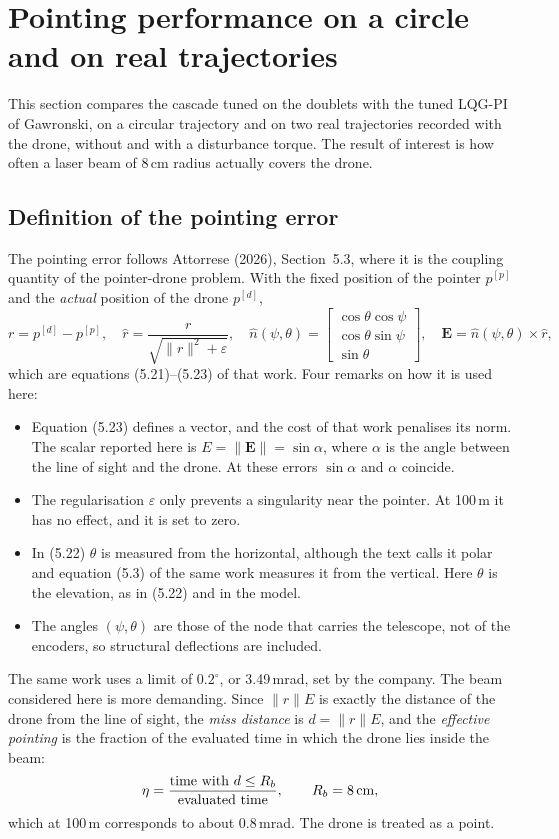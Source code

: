 \section{Pointing performance on a circle and on real trajectories}\label{sec:thesis}
This section compares the cascade tuned on the doublets with the tuned LQG-PI of Gawronski, on a circular trajectory and on two real trajectories recorded with the drone, without and with a disturbance torque. The result of interest is how often a laser beam of 8\,cm radius actually covers the drone.

\subsection{Definition of the pointing error}\label{sec:tp_def}
The pointing error follows Attorrese (2026), Section~5.3, where it is the coupling quantity of the pointer-drone problem. With the fixed position of the pointer $p^{[p]}$ and the \emph{actual} position of the drone $p^{[d]}$,
\begin{equation}
r=p^{[d]}-p^{[p]},\quad\hat r=\frac{r}{\sqrt{\lVert r\rVert^2+\varepsilon}},\quad
\hat n(\psi,\theta)=\begin{bmatrix}\cos\theta\cos\psi\\\cos\theta\sin\psi\\\sin\theta\end{bmatrix},\quad
\bm E=\hat n(\psi,\theta)\times\hat r,
\end{equation}
which are equations (5.21)--(5.23) of that work. Four remarks on how it is used here:
\begin{itemize}
\item Equation (5.23) defines a vector, and the cost of that work penalises its norm. The scalar reported here is $E=\lVert\bm E\rVert=\sin\alpha$, where $\alpha$ is the angle between the line of sight and the drone. At these errors $\sin\alpha$ and $\alpha$ coincide.
\item The regularisation $\varepsilon$ only prevents a singularity near the pointer. At 100\,m it has no effect, and it is set to zero.
\item In (5.22) $\theta$ is measured from the horizontal, although the text calls it polar and equation (5.3) of the same work measures it from the vertical. Here $\theta$ is the elevation, as in (5.22) and in the model.
\item The angles $(\psi,\theta)$ are those of the node that carries the telescope, not of the encoders, so structural deflections are included.
\end{itemize}
The same work uses a limit of $0.2^\circ$, or 3.49\,mrad, set by the company. The beam considered here is more demanding. Since $\lVert r\rVert E$ is exactly the distance of the drone from the line of sight, the \emph{miss distance} is $d=\lVert r\rVert E$, and the \emph{effective pointing} is the fraction of the evaluated time in which the drone lies inside the beam:
\begin{equation}
\eta=\frac{\text{time with }d\le R_b}{\text{evaluated time}},\qquad R_b=8\text{\,cm},
\end{equation}
which at 100\,m corresponds to about 0.8\,mrad. The drone is treated as a point.

